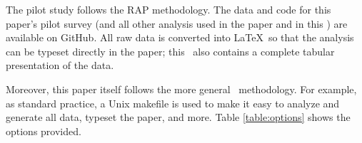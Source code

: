 \documentclass[10pt,a4paper]{article}
\begin{document}



The pilot study follows the RAP methodology. The data and code for this paper's pilot survey (and all other analysis used in the paper and in this \supplement) are available on GitHub. All raw data is converted into \LaTeX\ so that the analysis can be typeset directly in the paper; this \supplement\ also contains a complete tabular presentation of the data.

Moreover, this paper itself follows the more general \RAPstar\ methodology. For example, as standard practice, a Unix makefile is used to make it easy to analyze and generate all data, typeset the paper, and more. Table \ref{table:options} shows the options provided.

\begin{table}[t]
\begin{center}

\end{center}
\caption{Conforming to the \RAPstar\ methodology, the abbreviated summary above was generated automatically, by using \texttt{make data}. %
}
\label{table:options}
\end{table}
\end{document}
